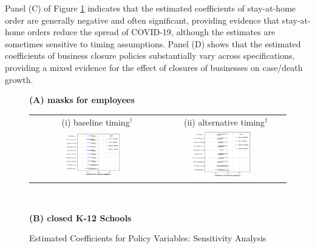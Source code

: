 \documentclass[11pt,reqno,letter]{amsart}
\theoremstyle{definition}
\begin{document}
Panel (C) of Figure  \ref{fig:whisker} indicates that the estimated coefficients of stay-at-home order  are generally negative and often significant, providing evidence that stay-at-home orders reduce the spread of COVID-19, although the estimates are sometimes sensitive to timing assumptions.  Panel (D) shows that the estimated coefficients of business closure policies substantially vary across specifications, providing a mixed evidence for the effect of closures of businesses on case/death growth.

\begin{figure}[ht]
  \caption{Estimated Coefficients for  Policy Variables: Sensitivity Analysis \label{fig:whisker}}\bigskip
  \begin{minipage}{\linewidth}
    \centering
   {\textbf{(A)  masks for employees}}\\
    \medskip
    \begin{tabular}{cc}
 $\quad$  (i) baseline timing$^\dagger$ &$\quad$ (ii) alternative timing$^\ddagger$\\
      \includegraphics[width=0.5\textwidth]{tables_and_figures/pmaskbus-whisker-14}
      &
      \includegraphics[width=0.5\textwidth]{tables_and_figures/pmaskbus-whisker-7}
    \end{tabular}
  \end{minipage} \\\smallskip
    \begin{minipage}{\linewidth}
    \centering
     {\textbf{(B)  closed K-12 Schools}}\\

\end{minipage}
\end{figure}
\end{document}
